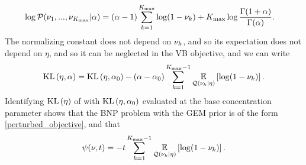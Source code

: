 \begin{ex}
\begin{align*}
%
\log \p(\nu_1, ..., \nu_\kmax \vert \alpha)
    ={}& (\alpha - 1) \sum_{k=1}^\kmax \log (1 - \nuk)
    + \kmax \log \frac{\Gamma(1 + \alpha)}{\Gamma(\alpha)}.
%
\end{align*}
%
The normalizing constant does not depend on $\nu_{k}$, and so its expectation
does not depend on $\eta$, and so it can be neglected in the VB objective,
and we can write
%
\begin{align*}
%
\KL{\eta, \alpha} = \KL{\eta, \alpha_0}
-(\alpha - \alpha_0) \sum_{\k=1}^{\kmax - 1}
    \expect{\q(\nuk \vert \eta)}{\log (1 - \nuk)}.
%
\end{align*}
%
Identifying $\mathrm{KL}\left(\eta\right)$ of  with $\mathrm{KL}\left(\eta, \alpha_0\right)$ evaluated
at the base concentration parameter shows that the BNP problem with the GEM
prior is of the form \eqref{perturbed_objective}, and that
%
\begin{align*}
%
\psi(\nu, \t) = -\t \sum_{\k=1}^{\kmax - 1}
    \expect{\q(\nuk \vert \eta)}{\log (1 - \nuk)}.
%
\end{align*}
%
\end{ex}
